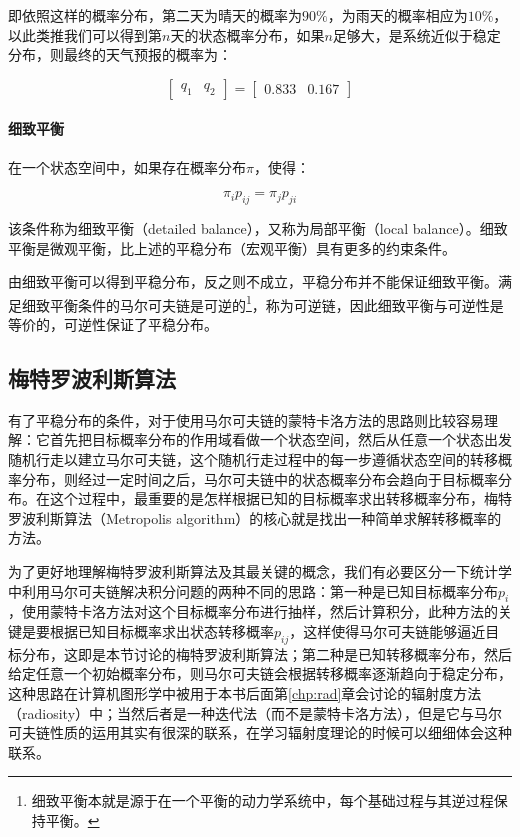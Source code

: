 \noindent 即依照这样的概率分布，第二天为晴天的概率为$90\%$，为雨天的概率相应为$10\%$，以此类推我们可以得到第$n$天的状态概率分布，如果$n$足够大，是系统近似于稳定分布，则最终的天气预报的概率为：

\begin{equation}
	\begin{bmatrix}
		q_1&q_2
	\end{bmatrix}=\begin{bmatrix}
		0.833&0.167
	\end{bmatrix}
\end{equation}





\paragraph{细致平衡}
在一个状态空间中，如果存在概率分布$\pi$，使得：

\begin{equation}
	\pi_i p_{ij}=\pi_j p_{ji}
\end{equation}

\noindent 该条件称为细致平衡（detailed balance），又称为局部平衡（local balance）。细致平衡是微观平衡，比上述的平稳分布（宏观平衡）具有更多的约束条件。

由细致平衡可以得到平稳分布，反之则不成立，平稳分布并不能保证细致平衡。满足细致平衡条件的马尔可夫链是可逆的\footnote{细致平衡本就是源于在一个平衡的动力学系统中，每个基础过程与其逆过程保持平衡。}，称为可逆链，因此细致平衡与可逆性是等价的，可逆性保证了平稳分布。






\subsection{梅特罗波利斯算法}
有了平稳分布的条件，对于使用马尔可夫链的蒙特卡洛方法的思路则比较容易理解：它首先把目标概率分布的作用域看做一个状态空间，然后从任意一个状态出发随机行走以建立马尔可夫链，这个随机行走过程中的每一步遵循状态空间的转移概率分布，则经过一定时间之后，马尔可夫链中的状态概率分布会趋向于目标概率分布。在这个过程中，最重要的是怎样根据已知的目标概率求出转移概率分布，梅特罗波利斯算法（Metropolis algorithm）的核心就是找出一种简单求解转移概率的方法。

为了更好地理解梅特罗波利斯算法及其最关键的概念，我们有必要区分一下统计学中利用马尔可夫链解决积分问题的两种不同的思路：第一种是已知目标概率分布$p_i$，使用蒙特卡洛方法对这个目标概率分布进行抽样，然后计算积分，此种方法的关键是要根据已知目标概率求出状态转移概率$p_{ij}$，这样使得马尔可夫链能够逼近目标分布，这即是本节讨论的梅特罗波利斯算法；第二种是已知转移概率分布，然后给定任意一个初始概率分布，则马尔可夫链会根据转移概率逐渐趋向于稳定分布，这种思路在计算机图形学中被用于本书后面第\ref{chp:rad}章会讨论的辐射度方法（radiosity）中；当然后者是一种迭代法（而不是蒙特卡洛方法），但是它与马尔可夫链性质的运用其实有很深的联系，在学习辐射度理论的时候可以细细体会这种联系。

